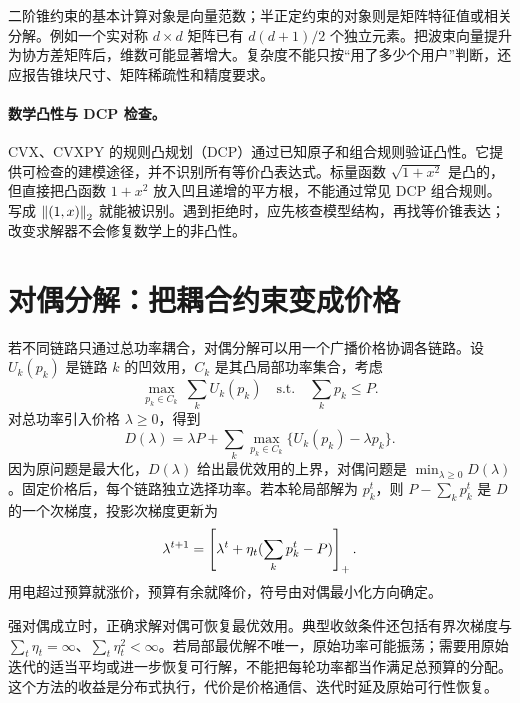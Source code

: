 二阶锥约束的基本计算对象是向量范数；半正定约束的对象则是矩阵特征值或相关分解。例如一个实对称 $d\times d$ 矩阵已有 $d(d+1)/2$ 个独立元素。把波束向量提升为协方差矩阵后，维数可能显著增大。复杂度不能只按“用了多少个用户”判断，还应报告锥块尺寸、矩阵稀疏性和精度要求。

\paragraph{数学凸性与 DCP 检查。}
CVX、CVXPY 的规则凸规划（DCP）通过已知原子和组合规则验证凸性。它提供可检查的建模途径，并不识别所有等价凸表达式。标量函数 $\sqrt{1+x^2}$ 是凸的，但直接把凸函数 $1+x^2$ 放入凹且递增的平方根，不能通过常见 DCP 组合规则。写成 $\left\lVert (1,x)\right\rVert_2$ 就能被识别。遇到拒绝时，应先核查模型结构，再找等价锥表达；改变求解器不会修复数学上的非凸性。

\section{对偶分解：把耦合约束变成价格}
若不同链路只通过总功率耦合，对偶分解可以用一个广播价格协调各链路。设 $U_k(p_k)$ 是链路 $k$ 的凹效用，$C_k$ 是其凸局部功率集合，考虑
\begin{equation}
 \max_{p_k\in C_k}\ \sum_k U_k(p_k)
 \quad\text{s.t.}\quad \sum_k p_k\le P.
 \label{eq:dual-resource}
\end{equation}
对总功率引入价格 $\lambda\ge0$，得到
\begin{equation}
 D(\lambda)=\lambda P+
 \sum_k\max_{p_k\in C_k}\{U_k(p_k)-\lambda p_k\}.
\end{equation}
因为原问题是最大化，$D(\lambda)$ 给出最优效用的上界，对偶问题是 $\min_{\lambda\ge0}D(\lambda)$。固定价格后，每个链路独立选择功率。若本轮局部解为 $p_k^t$，则 $P-\sum_k p_k^t$ 是 $D$ 的一个次梯度，投影次梯度更新为
\begin{equation}
 \lambda^{t+1}=\left[\lambda^t+\eta_t(\sum_k p_k^t-P)\right]_+.
 \label{eq:price-update}
\end{equation}
用电超过预算就涨价，预算有余就降价，符号由对偶最小化方向确定。

强对偶成立时，正确求解对偶可恢复最优效用。典型收敛条件还包括有界次梯度与 $\sum_t\eta_t=\infty$、$\sum_t\eta_t^2<\infty$。若局部最优解不唯一，原始功率可能振荡；需要用原始迭代的适当平均或进一步恢复可行解，不能把每轮功率都当作满足总预算的分配。这个方法的收益是分布式执行，代价是价格通信、迭代时延及原始可行性恢复。

